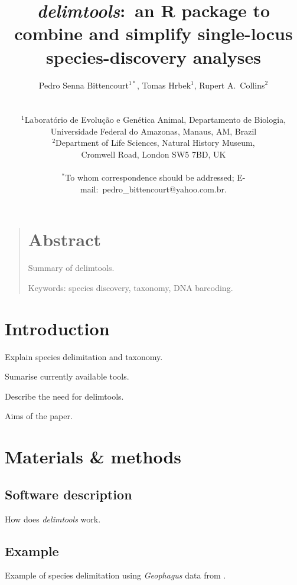 \documentclass[12pt]{article}
\title{\textsl{delimtools}:\ an R package to combine and simplify single-locus species-discovery analyses}
\author
{Pedro Senna Bittencourt$^{1\ast}$, Tomas Hrbek$^{1}$, Rupert A.\ Collins$^{2}$\\ \\
\\
\small{$^{1}$Laboratório de Evolução e Genética Animal, Departamento de Biologia,}\\
\small{Universidade Federal do Amazonas, Manaus, AM, Brazil}\\
\small{$^{2}$Department of Life Sciences, Natural History Museum,}\\
\small{Cromwell Road, London SW5 7BD, UK}\\
\\
\normalsize{$^\ast$To whom correspondence should be addressed; E-mail:\ pedro\_bittencourt@yahoo.com.br.}
}
\date{}
\newenvironment{sciabstract}{%
\begin{quote} \bf}
{\end{quote}}
\begin{document}
 

\baselineskip24pt

\maketitle 
\newpage
\linenumbers
\begin{sciabstract}
\section*{Abstract}
Summary of delimtools.%

\bigskip
Keywords: species discovery, taxonomy, DNA barcoding.
\end{sciabstract}

\newpage
\section*{Introduction}

Explain species delimitation and taxonomy.%

Sumarise currently available tools.%

Describe the need for delimtools.%

Aims of the paper.%


\section*{Materials \& methods}

\subsection*{Software description}

How does \textsl{delimtools} work.%

\subsection*{Example}

Example of species delimitation using \emph{Geophagus} data from \citet{Ximenes2021}.%

\end{document}
